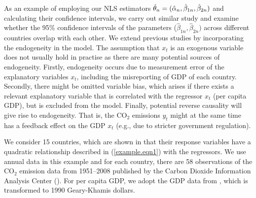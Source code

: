 As an example of employing our NLS estimators $\hat{\theta}_n = (\hat{\alpha}_n, \hat{\beta}_{1n}, \hat{\beta}_{2n})$ and calculating their confidence intervals, we carry out similar study and examine whether the 95\% confidence intervals of the parameters ($\hat{\beta}_{1n}, \hat{\beta}_{2n})$ across different countries overlap with each other. We extend previous studies by incorporating the endogeneity in the model. The assumption that $x_t$ is an exogenous variable does not usually hold in practise as there are many potential sources of endogeneity. Firstly, endogeneity occurs due to measurement error of the explanatory variables $x_t$, including the misreporting of GDP of each country. Secondly, there might be omitted variable bias, which arises if there exists a relevant explanatory variable that is correlated with the regressor $x_t$ (per capita GDP), but is excluded from the model. Finally, potential reverse causality will give rise to endogeneity. That is, the CO$_2$ emissions $y_t$ might at the same time has a feedback effect on the GDP $x_t$ (e.g., due to stricter government regulation).


We consider 15 countries, which are shown in \cite{piaggiopadilla2010} that their response variables have a quadratic relationship described in (\ref{example.eqn1}) with the regressors. We use annual data in this example and for each country, there are 58 observations of the CO$_2$ emission data from 1951--2008 published by the Carbon Dioxide Information Analysis Center (\cite{bodenmarlandandres2009}). For per capita GDP, we adopt the GDP data from \cite{maddison2003}, which is transformed to 1990 Geary-Khamis dollars.

